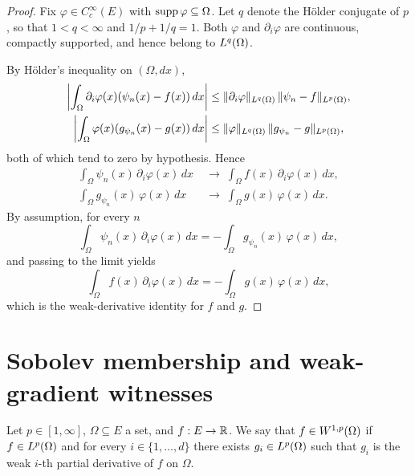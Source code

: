 \begin{proof}
\leanok

Fix $\varphi \in C_c^\infty(E)$ with $\operatorname{supp}\varphi \subseteq \Omega$. Let $q$
denote the H{\"o}lder conjugate of $p$, so that $1 < q < \infty$ and $1/p + 1/q
= 1$. Both $\varphi$ and $\partial_i\varphi$ are continuous, compactly
supported, and hence belong to $L^{q}(\Omega)$.

By H{\"o}lder's inequality on $(\Omega, dx)$,
\begin{align*}
  \left| \int_\Omega \partial_i\varphi(x) (\psi_n(x) - f(x))\,dx \right|
  &\le \|\partial_i\varphi\|_{L^{q}(\Omega)}\,\|\psi_n - f\|_{L^{p}(\Omega)},\\
  \left| \int_\Omega \varphi(x) (g_{\psi_n}(x) - g(x))\,dx \right|
  &\le \|\varphi\|_{L^{q}(\Omega)}\,\|g_{\psi_n} - g\|_{L^{p}(\Omega)},
\end{align*}
both of which tend to zero by hypothesis. Hence
\begin{align*}
  \int_\Omega \psi_n(x)\,\partial_i\varphi(x)\,dx
    &\;\to\; \int_\Omega f(x)\,\partial_i\varphi(x)\,dx, \\
  \int_\Omega g_{\psi_n}(x)\,\varphi(x)\,dx
    &\;\to\; \int_\Omega g(x)\,\varphi(x)\,dx.
\end{align*}
By assumption, for every $n$
\begin{equation*}
  \int_\Omega \psi_n(x)\,\partial_i\varphi(x)\,dx
    = -\int_\Omega g_{\psi_n}(x)\,\varphi(x)\,dx,
\end{equation*}
and passing to the limit yields
\begin{equation*}
  \int_\Omega f(x)\,\partial_i\varphi(x)\,dx
    = -\int_\Omega g(x)\,\varphi(x)\,dx,
\end{equation*}
which is the weak-derivative identity for $f$ and $g$.
\end{proof}

\section{Sobolev membership and weak-gradient witnesses}

\begin{definition}
\label{def:MemW1p}
\leanok
{}
Let $p \in [1,\infty]$, $\Omega \subseteq E$ a set, and $f : E \to \mathbb{R}$. We say
that $f \in W^{1,p}(\Omega)$ if $f \in L^{p}(\Omega)$ and for every $i \in
\{1,\ldots,d\}$ there exists $g_i \in L^{p}(\Omega)$ such that $g_i$ is the
weak $i$-th partial derivative of $f$ on $\Omega$.
\end{definition}

